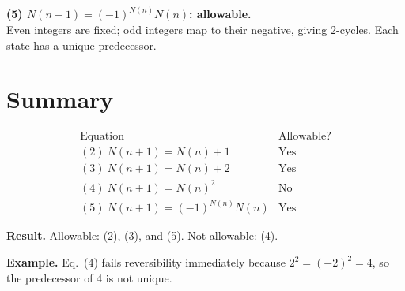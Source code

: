 \documentclass[11pt]{article}
\newcommand{\resultbox}[1]{%
  \begingroup\setlength{\fboxsep}{10pt}\noindent
  \colorbox{purple!8}{\parbox{\dimexpr\linewidth-2\fboxsep\relax}{\textbf{Result. }#1}}
  \endgroup
}
\newcommand{\examplebox}[1]{%
  \begingroup\setlength{\fboxsep}{10pt}\noindent
  \colorbox{green!8}{\parbox{\dimexpr\linewidth-2\fboxsep\relax}{\textbf{Example. }#1}}
  \endgroup
}
\begin{document}
\textbf{(5) \(N(n+1)=(-1)^{N(n)}N(n)\): allowable.}\\
Even integers are fixed; odd integers map to their negative, giving 2-cycles.
Each state has a unique predecessor.

\section*{Summary}
\[
\begin{array}{c|c}
\text{Equation} & \text{Allowable?} \\
\hline
(2)\ N(n+1)=N(n)+1 & \text{Yes} \\
(3)\ N(n+1)=N(n)+2 & \text{Yes} \\
(4)\ N(n+1)=N(n)^2 & \text{No} \\
(5)\ N(n+1)=(-1)^{N(n)}N(n) & \text{Yes}
\end{array}
\]

\resultbox{Allowable: (2), (3), and (5). Not allowable: (4).}

\examplebox{Eq.\ (4) fails reversibility immediately because
\(2^2=(-2)^2=4\), so the predecessor of 4 is not unique.}
\end{document}
